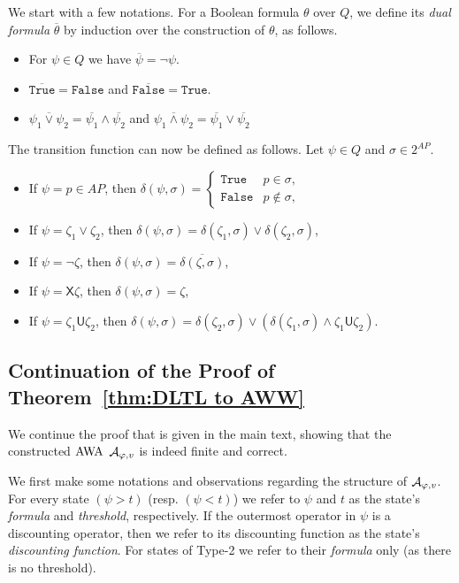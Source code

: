 \documentclass{llncs}
\newcommand{\True}{\mathtt{True}}
\newcommand{\False}{\mathtt{False}}
\newcommand{\Next}{\mathsf{X}}
\newcommand{\Until}{\mathsf{U}}
\newcommand{\AWW}{\mbox{\rm AWA}\xspace}
\newcommand{\A}{{\cal A}}
\renewcommand{\phi}{\varphi}
\begin{document}
We start with a few notations. For a Boolean formula $\theta$ over $Q$, we define its {\em dual formula} $\overline{\theta}$ by induction over the construction of $\theta$, as follows.
\begin{itemize}
\item For $\psi\in Q$ we have $\overline{\psi}=\neg \psi$.
\item $\overline{\True}=\False$ and $\overline{\False}=\True$.
\item $\overline{\psi_1\vee\psi_2}=\overline{\psi_1}\wedge \overline{\psi_2}$ and $\overline{\psi_1\wedge\psi_2}=\overline{\psi_1}\vee \overline{\psi_2}$
\end{itemize}
The transition function can now be defined as follows. Let $\psi\in Q$ and $\sigma\in 2^{AP}$.
\begin{itemize}
\item If $\psi=p\in AP$, then $\delta(\psi,\sigma)=\begin{cases}
\True & p\in \sigma,\\
\False & p\notin \sigma,
\end{cases}$
\item If $\psi=\zeta _1\vee\zeta_2$, then $\delta(\psi,\sigma)=\delta(\zeta_1,\sigma)\vee\delta(\zeta_2,\sigma)$,
\item If $\psi=\neg \zeta$, then $\delta(\psi,\sigma)=\overline{\delta(\zeta,\sigma)}$,
\item If $\psi=\Next \zeta$, then $\delta(\psi,\sigma)=\zeta$,
\item If $\psi=\zeta_1\Until\zeta_2$, then $\delta(\psi,\sigma)=\delta(\zeta_2,\sigma)\vee(\delta(\zeta_1,\sigma)\wedge \zeta_1\Until\zeta_2)$.
\end{itemize}


\subsection{Continuation of the Proof of Theorem~\ref{thm:DLTL to AWW}}
We continue the proof that is given in the main text, showing that the constructed $\AWW$ $\A_{\phi,v}$ is indeed finite and correct.

We first make some notations and observations regarding the structure of $\A_{\phi,v}$. For every state $(\psi > t)$ (resp. $(\psi<t)$) we refer to $\psi$ and $t$ as the state's {\em formula} and {\em threshold}, respectively. If the outermost operator in $\psi$ is a discounting operator, then we refer to its discounting function as the state's {\em discounting function}. For states of Type-2 we refer to their {\em formula} only (as there is no threshold).
\end{document}
